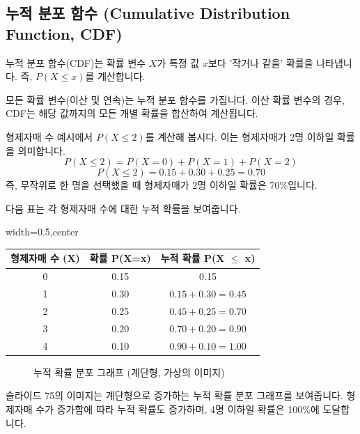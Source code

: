 \documentclass[11pt,a4paper]{book}
\theoremstyle{definition}
\begin{document}
\subsection{누적 분포 함수 (Cumulative Distribution Function, CDF)}

\begin{summarybox}[title={누적 분포 함수 핵심 요약}]
누적 분포 함수(CDF)는 확률 변수 \(X\)가 특정 값 \(x\)보다 '작거나 같을' 확률을 나타냅니다. 즉, \(P(X \le x)\)를 계산합니다.
\end{summarybox}

모든 확률 변수(이산 및 연속)는 누적 분포 함수를 가집니다. 이산 확률 변수의 경우, CDF는 해당 값까지의 모든 개별 확률을 합산하여 계산됩니다.

\begin{examplebox}[title={누적 분포 함수 예시: 형제자매 수}]
형제자매 수 예시에서 \(P(X \le 2)\)를 계산해 봅시다. 이는 형제자매가 2명 이하일 확률을 의미합니다.
\[ P(X \le 2) = P(X=0) + P(X=1) + P(X=2) \]
\[ P(X \le 2) = 0.15 + 0.30 + 0.25 = 0.70 \]
즉, 무작위로 한 명을 선택했을 때 형제자매가 2명 이하일 확률은 70\%입니다.

다음 표는 각 형제자매 수에 대한 누적 확률을 보여줍니다.

\begin{adjustbox}{width=0.5\textwidth,center}
\begin{tabular}{ccc}
\toprule
\textbf{형제자매 수 (X)} & \textbf{확률 P(X=x)} & \textbf{누적 확률 P(X \(\le\) x)} \\
\midrule
0 & 0.15 & 0.15 \\
1 & 0.30 & \(0.15 + 0.30 = 0.45\) \\
2 & 0.25 & \(0.45 + 0.25 = 0.70\) \\
3 & 0.20 & \(0.70 + 0.20 = 0.90\) \\
4 & 0.10 & \(0.90 + 0.10 = 1.00\) \\
\bottomrule
\end{tabular}
\end{adjustbox}

\begin{figure}[h!]
    \centering
    \caption{누적 확률 분포 그래프 (계단형, 가상의 이미지)}
    \label{fig:cdf_plot}
\end{figure}
\begin{infobox}[title={가상의 이미지 설명: 누적 확률 분포 그래프}]
슬라이드 75의 이미지는 계단형으로 증가하는 누적 확률 분포 그래프를 보여줍니다. 형제자매 수가 증가함에 따라 누적 확률도 증가하며, 4명 이하일 확률은 100\%에 도달합니다.
\end{infobox}
\end{examplebox}
\end{document}
